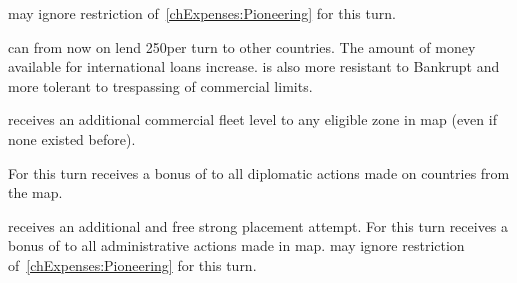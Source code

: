 


\phadm
\aparag \ENG may ignore restriction of~\ref{chExpenses:Pioneering} for this
turn.

\effetlong
\aparag \ENG can from now on lend 250\ducats per turn to other countries.
\aparag The amount of money available for international loans increase.
\aparag \ENG is also more resistant to Bankrupt and more tolerant to
trespassing of commercial limits.










\phevnt
\aparag \HOL receives an additional commercial fleet level to any eligible
\STZ zone in \ROTW map (even if none existed before).

\phdipl
\aparag For this turn \HOL receives a bonus of  to all diplomatic
actions made on countries from the \ROTW map.

\phadm
\aparag \HOL receives an additional and free strong \TP placement attempt.
\aparag For this turn \HOL receives a bonus of  to all
administrative actions made in \ROTW map.
\aparag \HOL may ignore restriction of~\ref{chExpenses:Pioneering} for this
turn.



